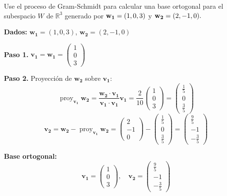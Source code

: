 \begin{prob} 
Use el proceso de Gram-Schmidt para calcular una base ortogonal para el subespacio $W$ de $\mathbb{R}^3$ generado por ${\bf{w_1}}=(1,0,3)$ y ${\bf{w_2}}=(2,-1,0).$
\begin{myproof}
\textbf{Dados:} $\mathbf{w_1} = (1, 0, 3)$, $\mathbf{w_2} = (2, -1, 0)$

\textbf{Paso 1.}  
$\mathbf{v_1} = \mathbf{w_1} = \begin{pmatrix} 1 \\ 0 \\ 3 \end{pmatrix}$

\textbf{Paso 2.}  
Proyección de $\mathbf{w_2}$ sobre $\mathbf{v_1}$:
\[
\operatorname{proy}_{\mathbf{v_1}} \mathbf{w_2} = \frac{\mathbf{w_2} \cdot \mathbf{v_1}}{\mathbf{v_1} \cdot \mathbf{v_1}} \mathbf{v_1} = \frac{2}{10} \begin{pmatrix} 1 \\ 0 \\ 3 \end{pmatrix} = \begin{pmatrix} \frac{1}{5} \\ 0 \\ \frac{3}{5} \end{pmatrix}
\]
\[
\mathbf{v_2} = \mathbf{w_2} - \operatorname{proy}_{\mathbf{v_1}} \mathbf{w_2} = \begin{pmatrix} 2 \\ -1 \\ 0 \end{pmatrix} - \begin{pmatrix} \frac{1}{5} \\ 0 \\ \frac{3}{5} \end{pmatrix} = \begin{pmatrix} \frac{9}{5} \\ -1 \\ -\frac{3}{5} \end{pmatrix}
\]

\textbf{Base ortogonal:}
\[
\boxed{\mathbf{v_1} = \begin{pmatrix} 1 \\ 0 \\ 3 \end{pmatrix}, \quad \mathbf{v_2} = \begin{pmatrix} \frac{9}{5} \\ -1 \\ -\frac{3}{5} \end{pmatrix}}
\]
\end{myproof}
\end{prob}

